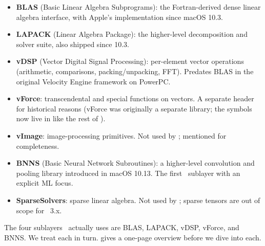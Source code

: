 \begin{itemize}
  \item \textbf{BLAS} (Basic Linear Algebra Subprograms): the
    Fortran-derived dense linear algebra interface, with Apple's
    implementation since macOS 10.3.
  \item \textbf{LAPACK} (Linear Algebra Package): the higher-level
    decomposition and solver suite, also shipped since 10.3.
  \item \textbf{vDSP} (Vector Digital Signal Processing): per-element
    vector operations (arithmetic, comparisons, packing/unpacking,
    FFT). Predates BLAS in the original Velocity Engine framework
    on PowerPC.
  \item \textbf{vForce}: transcendental and special functions on
    vectors. A separate header for historical reasons (vForce was
    originally a separate library; the symbols now live in
     like the rest of \Accelerate).
  \item \textbf{vImage}: image-processing primitives. Not used by
    \Lucid; mentioned for completeness.
  \item \textbf{BNNS} (Basic Neural Network Subroutines): a
    higher-level convolution and pooling library introduced in
    macOS 10.13. The first \Accelerate\ sublayer with an explicit
    ML focus.
  \item \textbf{SparseSolvers}: sparse linear algebra. Not used by
    \Lucid; sparse tensors are out of scope for \Lucid\ 3.x.
\end{itemize}

The four sublayers \Lucid\ actually uses are BLAS, LAPACK, vDSP,
vForce, and BNNS. We treat each in turn.
 gives a one-page overview before
we dive into each.

